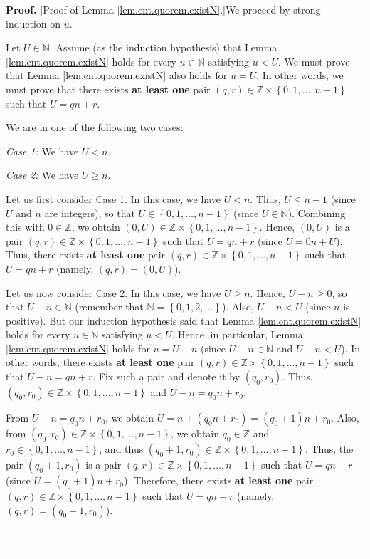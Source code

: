 \documentclass[numbers=enddot,12pt,final,onecolumn,notitlepage]{scrartcl}%
\numberwithin{exer}{subsection}
\theoremstyle{definition}
\newenvironment{proof}[1][Proof]{\noindent\textbf{#1.} }{\ \rule{0.5em}{0.5em}}
\begin{document}
\begin{proof}
[Proof of Lemma \ref{lem.ent.quorem.existN}.]We proceed by strong induction on
$u$.

Let $U\in\mathbb{N}$. Assume (as the induction hypothesis) that Lemma
\ref{lem.ent.quorem.existN} holds for every $u\in\mathbb{N}$ satisfying $u<U$.
We must prove that Lemma \ref{lem.ent.quorem.existN} also holds for $u=U$. In
other words, we must prove that there exists \textbf{at least one} pair
$\left(  q,r\right)  \in\mathbb{Z}\times\left\{  0,1,\ldots,n-1\right\}  $
such that $U=qn+r$.

We are in one of the following two cases:

\textit{Case 1:} We have $U<n$.

\textit{Case 2:} We have $U\geq n$.

Let us first consider Case 1. In this case, we have $U<n$. Thus, $U\leq n-1$
(since $U$ and $n$ are integers), so that $U\in\left\{  0,1,\ldots
,n-1\right\}  $ (since $U\in\mathbb{N}$). Combining this with $0\in\mathbb{Z}%
$, we obtain $\left(  0,U\right)  \in\mathbb{Z}\times\left\{  0,1,\ldots
,n-1\right\}  $. Hence, $\left(  0,U\right)  $ is a pair $\left(  q,r\right)
\in\mathbb{Z}\times\left\{  0,1,\ldots,n-1\right\}  $ such that $U=qn+r$
(since $U=0n+U$). Thus, there exists \textbf{at least one} pair $\left(
q,r\right)  \in\mathbb{Z}\times\left\{  0,1,\ldots,n-1\right\}  $ such that
$U=qn+r$ (namely, $\left(  q,r\right)  =\left(  0,U\right)  $).

Let us now consider Case 2. In this case, we have $U\geq n$. Hence, $U-n\geq
0$, so that $U-n\in\mathbb{N}$ (remember that $\mathbb{N}=\left\{
0,1,2,\ldots\right\}  $). Also, $U-n<U$ (since $n$ is positive). But our
induction hypothesis said that Lemma \ref{lem.ent.quorem.existN} holds for
every $u\in\mathbb{N}$ satisfying $u<U$. Hence, in particular, Lemma
\ref{lem.ent.quorem.existN} holds for $u=U-n$ (since $U-n\in\mathbb{N}$ and
$U-n<U$). In other words, there exists \textbf{at least one} pair $\left(
q,r\right)  \in\mathbb{Z}\times\left\{  0,1,\ldots,n-1\right\}  $ such that
$U-n=qn+r$. Fix such a pair and denote it by $\left(  q_{0},r_{0}\right)  $.
Thus, $\left(  q_{0},r_{0}\right)  \in\mathbb{Z}\times\left\{  0,1,\ldots
,n-1\right\}  $ and $U-n=q_{0}n+r_{0}$.

From $U-n=q_{0}n+r_{0}$, we obtain $U=n+\left(  q_{0}n+r_{0}\right)  =\left(
q_{0}+1\right)  n+r_{0}$. Also, from $\left(  q_{0},r_{0}\right)
\in\mathbb{Z}\times\left\{  0,1,\ldots,n-1\right\}  $, we obtain $q_{0}%
\in\mathbb{Z}$ and $r_{0}\in\left\{  0,1,\ldots,n-1\right\}  $, and thus
$\left(  q_{0}+1,r_{0}\right)  \in\mathbb{Z}\times\left\{  0,1,\ldots
,n-1\right\}  $. Thus, the pair $\left(  q_{0}+1,r_{0}\right)  $ is a pair
$\left(  q,r\right)  \in\mathbb{Z}\times\left\{  0,1,\ldots,n-1\right\}  $
such that $U=qn+r$ (since $U=\left(  q_{0}+1\right)  n+r_{0}$). Therefore,
there exists \textbf{at least one} pair $\left(  q,r\right)  \in
\mathbb{Z}\times\left\{  0,1,\ldots,n-1\right\}  $ such that $U=qn+r$ (namely,
$\left(  q,r\right)  =\left(  q_{0}+1,r_{0}\right)  $).


\end{proof}
\end{document}
